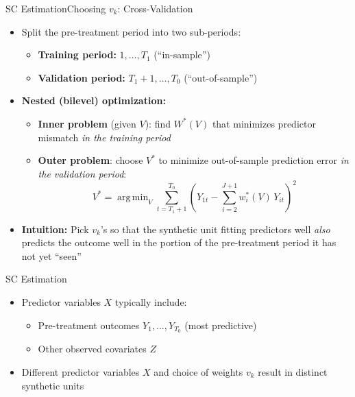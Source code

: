 \documentclass[dvipsnames,hyperref={pdfpagelabels=false}]{beamer}
\DeclareMathOperator*{\argmin}{arg\,min}
\begin{document}
\begin{frame}{SC Estimation}{Choosing $v_k$: Cross-Validation}
\begin{itemize}
	\item Split the pre-treatment period into two sub-periods:
	\vspace{0.2cm}
	\begin{itemize}
		\item \textbf{Training period:} $1,\ldots,T_1$ \quad (``in-sample'')
		\vspace{0.2cm}
		\item \textbf{Validation period:} $T_1{+}1,\ldots,T_0$ \quad (``out-of-sample'')
	\end{itemize}
	\vspace{0.2cm}
	\item \textbf{Nested (bilevel) optimization:}
	\vspace{0.1cm}
	\begin{itemize}
		\item \textbf{Inner problem} (given $V$): find $W^{*}(V)$ that minimizes predictor mismatch \textit{in the training period}
		\vspace{0.1cm}
		\item \textbf{Outer problem}: choose $V^{*}$ to minimize out-of-sample prediction error \textit{in the validation period}:
		\begin{equation*}
			V^{*} = \argmin_{V} \sum_{t=T_1+1}^{T_0}
			\left(Y_{1t} - \sum_{i=2}^{J+1} w^{*}_{i}(V)\,Y_{it}\right)^{2}
		\end{equation*}
	\end{itemize}
	\item \textbf{Intuition:} Pick $v_k$'s so that the synthetic unit fitting predictors well \textit{also} predicts the outcome well in the portion of the pre-treatment period it has not yet ``seen''
\end{itemize}
\end{frame}





\begin{frame}{SC Estimation}
	\begin{itemize}
		
	\item Predictor variables $X$ typically include:
				\vspace{0.2cm}
			\begin{itemize}
					\item Pre-treatment outcomes $Y_{1},...,Y_{T_0}$ (most predictive)
								\vspace{0.2cm}
					\item Other observed covariates $Z$ 
				\end{itemize}
			\vspace{0.2cm}
			\item Different predictor variables $X$ and choice of weights $v_k$ result in distinct synthetic units
	\end{itemize}
\end{frame}
\end{document}
